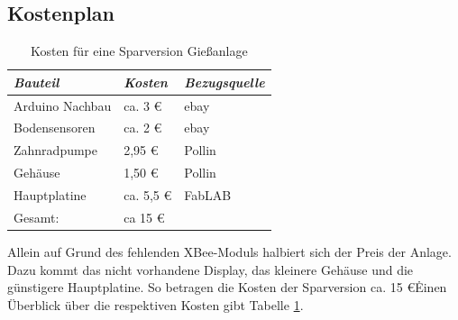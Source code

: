 	
	
	\subsection{Kostenplan}

	\begin{table}[!h]
		\centering
		\onehalfspacing
		\footnotesize
		\caption{Kosten für eine  Sparversion Gießanlage}
		\label{Kosten für eine Sparversion Giesanlage}
	\begin{tabular}{|l|ll|}
			\hline
		\textit{Bauteil} & \textit{Kosten} & \textit{Bezugsquelle} \\
		\hline
		Arduino Nachbau & ca. 3 \euro & ebay \\
		Bodensensoren & ca. 2 \euro & ebay \\
		Zahnradpumpe & 2,95 \euro & Pollin \\
		Gehäuse	& 1,50 \euro & Pollin \\
		Hauptplatine & ca. 5,5 \euro & FabLAB \\
		\hline
		Gesamt: & ca 15 \euro & \\
		\hline
	\end{tabular}
	\end{table}
	
	  	
	Allein auf Grund des fehlenden XBee-Moduls halbiert sich der Preis der Anlage.
	Dazu kommt das nicht vorhandene Display, das kleinere Gehäuse und die günstigere Hauptplatine.
	So betragen die Kosten der Sparversion ca. 15 \euro\. 
	Einen Überblick über die respektiven Kosten gibt Tabelle \ref{Kosten für eine Sparversion Giesanlage}.
	 

	